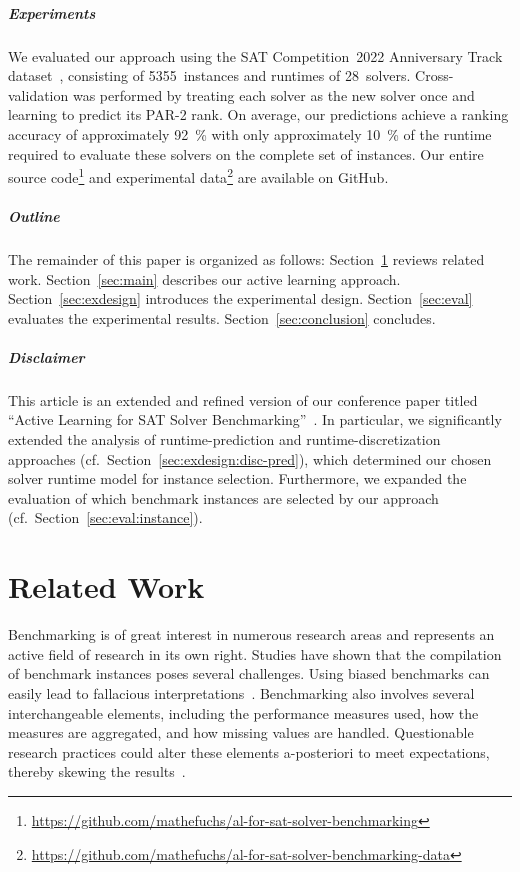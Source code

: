 \documentclass[sn-basic, Numbered]{sn-jnl} %
\begin{document}
\subparagraph{Experiments}

We evaluated our approach using the SAT Competition~2022 Anniversary Track dataset~\cite{sat2022}, consisting of 5355~instances and runtimes of 28~solvers.
Cross-validation was performed by treating each solver as the new solver once and learning to predict its PAR-2 rank.
On average, our predictions achieve a ranking accuracy of approximately \SI{92}{\%} with only approximately \SI{10}{\%} of the runtime required to evaluate these solvers on the complete set of instances.
Our entire source code\footnote{\url{https://github.com/mathefuchs/al-for-sat-solver-benchmarking}} and experimental data\footnote{\url{https://github.com/mathefuchs/al-for-sat-solver-benchmarking-data}} are available on GitHub.

\subparagraph{Outline}

The remainder of this paper is organized as follows:
Section~\ref{sec:related} reviews related work.
Section~\ref{sec:main} describes our active learning approach.
Section~\ref{sec:exdesign} introduces the experimental design.
Section~\ref{sec:eval} evaluates the experimental results.
Section~\ref{sec:conclusion} concludes.

\subparagraph{Disclaimer}

This article is an extended and refined version of our conference paper titled ``Active Learning for SAT Solver Benchmarking''~\cite{fuchs2023active}.
In particular, we significantly extended the analysis of runtime-prediction and runtime-discretization approaches (cf.~Section~\ref{sec:exdesign:disc-pred}), which determined our chosen solver runtime model for instance selection.
Furthermore, we expanded the evaluation of which benchmark instances are selected by our approach (cf.~Section~\ref{sec:eval:instance}).

\section{Related Work}
\label{sec:related}

Benchmarking is of great interest in numerous research areas and represents an active field of research in its own right.
Studies have shown that the compilation of benchmark instances poses several challenges.
Using biased benchmarks can easily lead to fallacious interpretations~\cite{abs-2107-07002}.
Benchmarking also involves several interchangeable elements, including the performance measures used, how the measures are aggregated, and how missing values are handled.
Questionable research practices could alter these elements a-posteriori to meet expectations, thereby skewing the results~\cite{NiesslHWCB22}.
\end{document}
